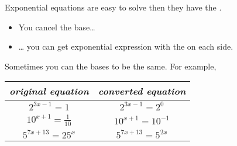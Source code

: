     Exponential equations are easy to solve then they have the 
     .
    \begin{tcolorbox}[center,colback=white,width=5.5in]
        \begin{itemize}
            \item You cancel the base\dots 
            \item \dots {} 
            you can get 
             exponential expression with the  
            on each side.
        \end{itemize}
    \end{tcolorbox}

    Sometimes you can  the bases to be the same. 
    For example,

    \vspace{-1\onelineskip}
    \begin{center} 
        \large
        \renewcommand{\arraystretch}{1.25}
        \begin{tabular}{c|c}
            \toprule
            {\itshape original equation} & {\itshape converted equation} \\
            \midrule 
            $ 2^{3x-1} = 1 $   &   $2^{3x-1} = 2^0$ \\
            $ 10^{x+1} = \frac{1}{10} $   &   $10^{x+1} = 10^{-1}$ \\
            $ 5^{7x+13} = 25^x $   &   $5^{7x+13} = 5^{2x}$ \\
            \bottomrule
        \end{tabular}
    \end{center}

